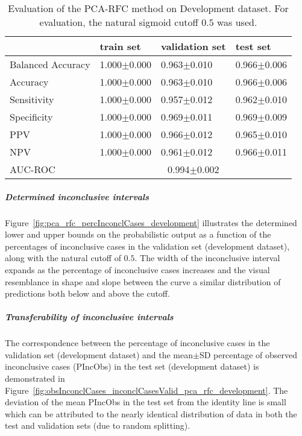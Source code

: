 \begin{table}[ht]
  \caption{Evaluation of the PCA-RFC method on Development dataset. 
  For evaluation, the natural sigmoid cutoff $0.5$ was used.}
  \centering
  \begin{tabular}{llll}
      \hline
                        & train set         & validation set      & test set             \\
      \hline
      Balanced Accuracy & 1.000$\pm$0.000   &   0.963$\pm$0.010    &  0.966$\pm$0.006   \\
      Accuracy          & 1.000$\pm$0.000    &   0.963$\pm$0.010  &  0.966$\pm$0.006    \\
      Sensitivity       &  1.000$\pm$0.000   &   0.957$\pm$0.012   &  0.962$\pm$0.010   \\
      Specificity       & 1.000$\pm$0.000    &   0.969$\pm$0.011  &  0.969$\pm$0.009   \\
      PPV               &  1.000$\pm$0.000   &   0.966$\pm$0.012   &  0.965$\pm$0.010   \\
      NPV               &  1.000$\pm$0.000   &   0.961$\pm$0.012  &  0.966$\pm$0.011   \\
      \hline
      AUC-ROC          &  \multicolumn{3}{c}{0.994$\pm$0.002}  \\
      \hline
  \end{tabular}
 \label{t1:erc_perf_eval_table}
\end{table}


\subparagraph{Determined inconclusive intervals}

Figure~\ref{fig:pca_rfc_percInconclCases_development} illustrates the determined lower and upper bounds on the 
probabilistic output as a function of the percentages of inconclusive cases in the validation set (development dataset), 
along with the natural cutoff of $0.5$.
The width of the inconclusive interval expands as the percentage of inconclusive cases increases 
and the visual resemblance in shape and slope between the curve a similar distribution of predictions both below and above the cutoff.

\subparagraph{Transferability of inconclusive intervals}

The correspondence between the percentage of inconclusive cases in the validation set (development dataset) and 
the mean$\pm$SD percentage of observed inconclusive cases (PIncObs) in the test set (development dataset) 
is demonstrated in Figure~\ref{fig:obsInconclCases_inconclCasesValid_pca_rfc_development}.
The deviation of the mean PIncObs in the test set from the 
identity line is small which can be attributed to the nearly identical distribution of data in both the test and validation sets 
(due to random splitting).


